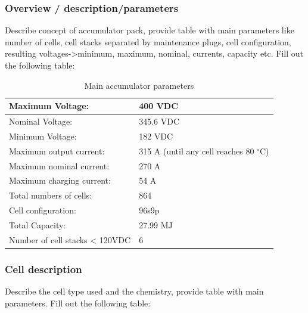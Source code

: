 \subsubsection{Overview / description/parameters}
Describe concept of accumulator pack, provide table with main parameters like number of cells, cell stacks separated by maintenance plugs, cell configuration, resulting voltages->minimum, maximum, nominal, currents, capacity etc.
Fill out the following table:

\begin{table}[H]
	\centering
	\caption{Main accumulator parameters}
	\begin{tabularx}{\textwidth}{|X|X|}
		\hline
		Maximum Voltage: & 400 VDC \\[\TableSize]
		\hline
		Nominal Voltage: & 345.6 VDC \\[\TableSize]
		\hline
		Minimum Voltage: & 182 VDC \\[\TableSize]
		\hline
		Maximum output current: & 315 A (until any cell reaches 80 $^\circ$C) \\[\TableSize]
		\hline
		Maximum nominal current: & 270 A \\[\TableSize]
		\hline
		Maximum charging current: & 54 A \\[\TableSize]
		\hline
		Total numbers of cells: & 864 \\[\TableSize]
		\hline
		Cell configuration: & 96s9p \\[\TableSize]
		\hline
		Total Capacity: & 27.99 MJ \\[\TableSize]
		\hline
		Number of cell stacks < 120VDC & 6 \\[\TableSize]
		\hline
	\end{tabularx}%
	\label{tab:acc-main}%
\end{table}%

\subsubsection{Cell description}
Describe the cell type used and the chemistry, provide table with main parameters.
Fill out the following table:

